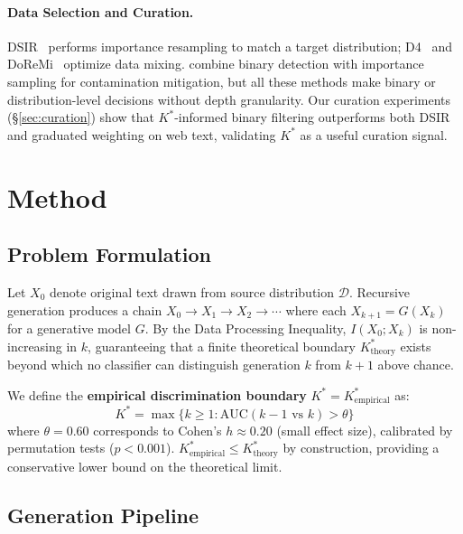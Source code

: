 \documentclass[11pt,a4paper]{article}
\begin{document}
\paragraph{Data Selection and Curation.}
DSIR~\citep{xie2023dsir} performs importance resampling to match a target distribution; D4~\citep{tirumala2023d4} and DoReMi~\citep{xie2024doremi} optimize data mixing. \citet{drayson2025} combine binary detection with importance sampling for contamination mitigation, but all these methods make binary or distribution-level decisions without depth granularity. Our curation experiments (\S\ref{sec:curation}) show that $K^*$-informed binary filtering outperforms both DSIR and graduated weighting on web text, validating $K^*$ as a useful curation signal.


\section{Method}\label{sec:method}

\subsection{Problem Formulation}

Let $X_0$ denote original text drawn from source distribution $\mathcal{D}$. Recursive generation produces a chain $X_0 \to X_1 \to X_2 \to \cdots$ where each $X_{k+1} = G(X_k)$ for a generative model $G$. By the Data Processing Inequality, $I(X_0; X_k)$ is non-increasing in $k$, guaranteeing that a finite theoretical boundary $K^*_{\text{theory}}$ exists beyond which no classifier can distinguish generation $k$ from $k\!+\!1$ above chance.

We define the \textbf{empirical discrimination boundary} $K^* = K^*_{\text{empirical}}$ as:
\begin{equation}
K^* = \max\{k \geq 1 : \text{AUC}(k\!-\!1 \text{ vs } k) > \theta\}
\end{equation}
where $\theta = 0.60$ corresponds to Cohen's $h \approx 0.20$ (small effect size), calibrated by permutation tests ($p < 0.001$). $K^*_{\text{empirical}} \leq K^*_{\text{theory}}$ by construction, providing a conservative lower bound on the theoretical limit.

\subsection{Generation Pipeline}
\end{document}
